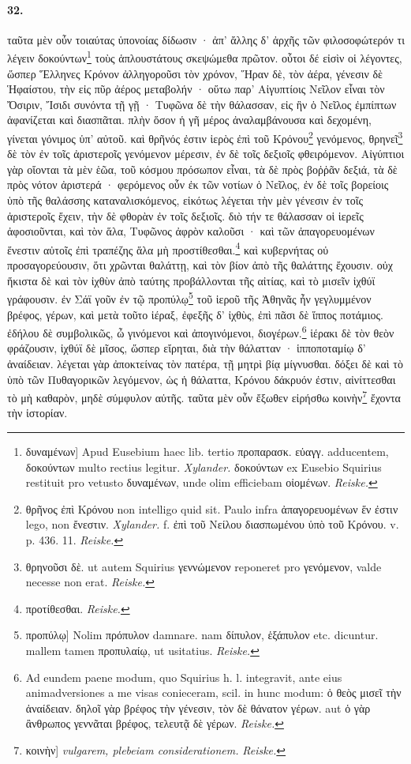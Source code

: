 \documentclass[a4paper, 11pt, oneside, polutonikogreek, german, landscape]{article}
\begin{document}
\paragraph{32.}
ταῦτα μὲν οὖν τοιαύτας ὑπονοίας δίδωσιν · ἀπ' ἄλλης δ' ἀρχῆς τῶν φιλοσοφώτερόν τι λέγειν δοκούντων\footnote{δυναμένων] Apud Eusebium haec lib. tertio προπαρασκ. εὐαγγ. adducentem, δοκούντων multo rectius legitur. \emph{Xylander.} δοκούντων ex Eusebio Squirius restituit pro vetusto δυναμένων, unde olim efficiebam οἰομένων. \emph{Reiske.}} τοὺς ἁπλουστάτους σκεψώμεθα πρῶτον. οὗτοι δέ εἰσὶν οἱ λέγοντες, ὥσπερ Ἕλληνες Κρόνον ἀλληγοροῦσι τὸν χρόνον, Ἥραν δὲ, τὸν ἀέρα, γένεσιν δὲ Ἡφαίστου, τὴν εἰς πῦρ ἀέρος μεταβολήν · οὕτω παρ' Αἰγυπτίοις Νεῖλον εἶναι τὸν Ὄσιριν, Ἴσιδι συνόντα τῇ γῇ · Τυφῶνα δὲ τὴν θάλασσαν, εἰς ἣν ὁ Νεῖλος ἐμπίπτων ἀφανίζεται καὶ διασπᾶται. πλὴν ὅσον ἡ γῆ μέρος ἀναλαμβάνουσα καὶ δεχομένη, γίνεται γόνιμος ὑπ' αὐτοῦ. καὶ θρῆνός ἐστιν ἱερὸς ἐπὶ τοῦ Κρόνου\footnote{θρῆνος ἐπὶ Κρόνου non intelligo quid sit. Paulo infra ἀπαγορευομένων ἕν ἐστιν lego, non ἔνεστιν. \emph{Xylander.} f. ἐπὶ τοῦ Νείλου διασπωμένου ὑπὸ τοῦ Κρόνου. v. p. 436. 11. \emph{Reiske.}} γενόμενος, θρηνεῖ\footnote{θρηνοῦσι δὲ. ut autem Squirius γεννώμενον reponeret pro γενόμενον, valde necesse non erat. \emph{Reiske.}} δὲ τὸν ἐν τοῖς ἀριστεροῖς γενόμενον μέρεσιν, ἐν δὲ τοῖς δεξιοῖς φθειρόμενον. Αἰγύπτιοι γὰρ οἴονται τὰ μὲν ἑῶα, τοῦ κόσμου πρόσωπον εἶναι, τὰ δὲ πρὸς βοῤῥᾶν δεξιά, τὰ δὲ πρὸς νότον ἀριστερά · φερόμενος οὖν ἐκ τῶν νοτίων ὁ Νεῖλος, ἐν δὲ τοῖς βορείοις ὑπὸ τῆς θαλάσσης καταναλισκόμενος, εἰκότως λέγεται τὴν μὲν γένεσιν ἐν τοῖς ἀριστεροῖς ἔχειν, τὴν δὲ φθορὰν ἐν τοῖς δεξιοῖς. διὸ τήν τε θάλασσαν οἱ ἱερεῖς ἀφοσιοῦνται, καὶ τὸν ἅλα, Τυφῶνος ἀφρὸν καλοῦσι · καὶ τῶν ἀπαγορευομένων ἕνεστιν αὐτοῖς ἐπὶ τραπέζης ἅλα μὴ προστίθεσθαι.\footnote{προτίθεσθαι. \emph{Reiske.}} καὶ κυβερνήτας οὐ προσαγορεύουσιν, ὅτι χρῶνται θαλάττῃ, καὶ τὸν βίον ἀπὸ τῆς θαλάττης ἔχουσιν. οὐχ ἥκιστα δὲ καὶ τὸν ἰχθὺν ἀπὸ ταύτης προβάλλονται τῆς αἰτίας, καὶ τὸ μισεῖν ἰχθύϊ γράφουσιν. ἐν Σάϊ γοῦν ἐν τῷ προπύλῳ\footnote{προπύλῳ] Nolim πρόπυλον damnare. nam δίπυλον, ἑξάπυλον etc. dicuntur. mallem tamen προπυλαίῳ, ut usitatius. \emph{Reiske.}} τοῦ ἱεροῦ τῆς Ἀθηνᾶς ἦν γεγλυμμένον βρέφος, γέρων, καὶ μετὰ τοῦτο ἱέραξ, ἐφεξῆς δ' ἰχθὺς, ἐπὶ πᾶσι δὲ ἵππος ποτάμιος. ἐδήλου δὲ συμβολικῶς, ὦ γινόμενοι καὶ ἀπογινόμενοι, διογέρων.\footnote{Ad eundem paene modum, quo Squirius h. l. integravit, ante eius animadversiones a me visas conieceram, scil. in hunc modum: ὁ θεὸς μισεῖ τὴν ἀναίδειαν. δηλοῖ γὰρ βρέφος τὴν γένεσιν, τὸν δὲ θάνατον γέρων. aut ὁ γὰρ ἂνθρωπος γεννᾶται βρέφος, τελευτᾷ δὲ γέρων. \emph{Reiske.}} ἱέρακι δὲ τὸν θεὸν φράζουσιν, ἰχθύϊ δὲ μῖσος, ὥσπερ εἴρηται, διὰ τὴν θάλατταν · ἱπποποταμίῳ δ' ἀναίδειαν. λέγεται γὰρ ἀποκτείνας τὸν πατέρα, τῇ μητρὶ βίᾳ μίγνυσθαι. δόξει δὲ καὶ τὸ ὑπὸ τῶν Πυθαγορικῶν λεγόμενον, ὡς ἡ θάλαττα, Κρόνου δάκρυόν ἐστιν, αἰνίττεσθαι τὸ μὴ καθαρὸν, μηδὲ σύμφυλον αὐτῆς. ταῦτα μὲν οὖν ἔξωθεν εἰρήσθω κοινὴν\footnote{κοινὴν] \emph{vulgarem, plebeiam considerationem.} \emph{Reiske.}} ἔχοντα τὴν ἱστορίαν.
\end{document}
